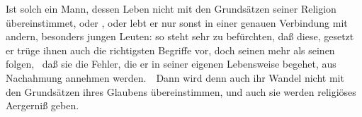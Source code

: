 \begin{aufza}
\begin{aufzb}
\item Ist solch ein Mann, dessen Leben nicht mit den Grundsätzen seiner Religion übereinstimmet,  oder , oder lebt er nur sonst in einer genauen Verbindung mit andern, besonders jungen Leuten: so steht sehr zu befürchten, daß diese, gesetzt  er trüge ihnen auch die richtigsten Begriffe vor, doch seinen  mehr als seinen  folgen, \dh\ daß sie die Fehler, die er in seiner eigenen Lebensweise begehet, aus Nachahmung annehmen werden.~\ Dann wird denn auch ihr Wandel nicht mit den Grundsätzen ihres Glaubens übereinstimmen, und auch sie werden religiöses Aergerniß geben.
\end{aufzb}
\end{aufza}

